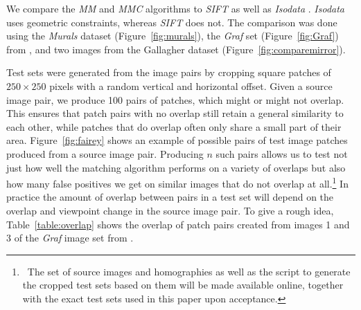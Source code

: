 \documentclass{article}
\begin{document}


%
%
We compare the \emph{MM} and \emph{MMC} algorithms to 
\emph{SIFT} \cite{lowe2004sift} as well 
as \emph{Isodata} \cite{das2008event}. 
\emph{Isodata} uses geometric constraints, whereas \emph{SIFT} does not.
The 
comparison was done using the \emph{Murals} dataset (Figure~\ref{fig:murals}), the 
\emph{Graf} set (Figure~\ref{fig:Graf}) from \cite{mikolajczyk2005performance}, and two 
images %
from the Gallagher dataset \cite{gallagher2008} (Figure~\ref{fig:comparemirror}).

Test sets were generated from the image pairs by cropping square patches of
$250\!\times\!250$ pixels with a random vertical and horizontal offset.  
Given a source image pair, we produce 100 pairs of patches, which might or might not overlap.  
This ensures that patch pairs with no overlap still retain a general similarity to each 
other, while patches that do overlap often only share a small 
part of their area. Figure~\ref{fig:fairey} shows an example of 
possible pairs of test image patches produced from a source image pair.  
Producing $n$ such pairs allows us to test not just how well the 
matching algorithm performs on a variety of overlaps but also how many 
false positives we get on similar images that do not overlap at 
all.\footnote{~The set of source images and homographies as well as the 
script to generate the cropped test sets based on them will be made 
available online, together with the exact test sets used in this paper 
upon acceptance.}
In practice the amount of overlap between pairs in a test set will 
depend on the overlap and viewpoint change in the source image pair.  To 
give a rough idea, Table~\ref{table:overlap} 
shows the overlap of patch pairs created from images 1 and 3 of the 
\emph{Graf} image set from \cite{mikolajczyk2005performance}.
\end{document}
